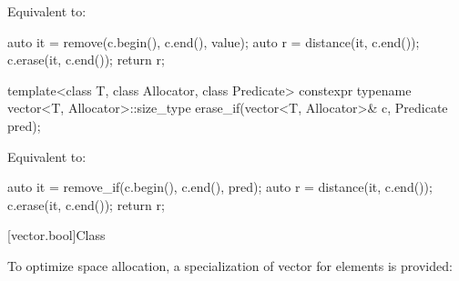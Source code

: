 \begin{itemdescr}
\pnum
\effects
Equivalent to:
\begin{codeblock}
auto it = remove(c.begin(), c.end(), value);
auto r = distance(it, c.end());
c.erase(it, c.end());
return r;
\end{codeblock}
\end{itemdescr}

%
\begin{itemdecl}
template<class T, class Allocator, class Predicate>
  constexpr typename vector<T, Allocator>::size_type
    erase_if(vector<T, Allocator>& c, Predicate pred);
\end{itemdecl}

\begin{itemdescr}
\pnum
\effects
Equivalent to:
\begin{codeblock}
auto it = remove_if(c.begin(), c.end(), pred);
auto r = distance(it, c.end());
c.erase(it, c.end());
return r;
\end{codeblock}
\end{itemdescr}

[vector.bool]{Class }

\pnum
{}%
To optimize space allocation, a specialization of vector for
elements is provided:


